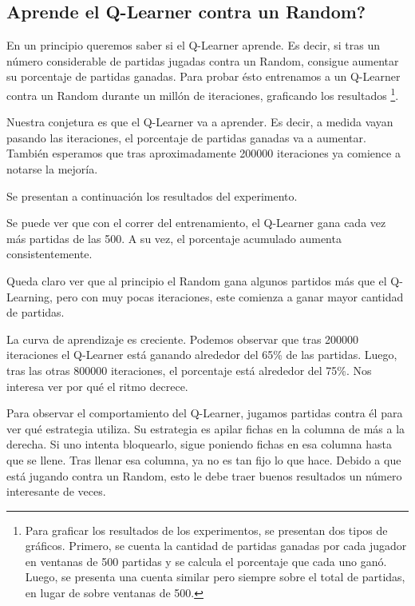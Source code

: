 \subsection{Aprende el Q-Learner contra un Random?}

En un principio queremos saber si el Q-Learner aprende. Es decir, si tras un número considerable de partidas jugadas contra un Random, consigue aumentar su porcentaje de partidas ganadas. Para probar ésto entrenamos a un Q-Learner contra un Random durante un millón de iteraciones, graficando los resultados \footnote{Para graficar los resultados de los experimentos, se presentan dos tipos de gráficos. Primero, se cuenta la cantidad de partidas ganadas por cada jugador en ventanas de 500 partidas y se calcula el porcentaje que cada uno ganó. Luego, se presenta una cuenta similar pero siempre sobre el total de partidas, en lugar de sobre ventanas de 500.}.

Nuestra conjetura es que el Q-Learner va a aprender. Es decir, a medida vayan pasando las iteraciones, el porcentaje de partidas ganadas va a aumentar. También esperamos que tras aproximadamente 200000 iteraciones ya comience a notarse la mejoría.

Se presentan a continuación los resultados del experimento. %



Se puede ver que con el correr del entrenamiento, el Q-Learner gana cada vez m\'as partidas de las 500. A su vez, el porcentaje acumulado aumenta consistentemente.

Queda claro ver que al principio el Random gana algunos partidos m\'as que el Q-Learning, pero con muy pocas iteraciones, este comienza a ganar mayor cantidad de partidas.

La curva de aprendizaje es creciente. Podemos observar que tras 200000 iteraciones el Q-Learner está ganando alrededor del 65\% de las partidas. Luego, tras las otras 800000 iteraciones, el porcentaje está alrededor del 75\%. Nos interesa ver por qué el ritmo decrece.

Para observar el comportamiento del Q-Learner, jugamos partidas contra él para ver qué estrategia utiliza. Su estrategia es apilar fichas en la columna de más a la derecha. Si uno intenta bloquearlo, sigue poniendo fichas en esa columna hasta que se llene. Tras llenar esa columna, ya no es tan fijo lo que hace. Debido a que está jugando contra un Random, esto le debe traer buenos resultados un número interesante de veces.

